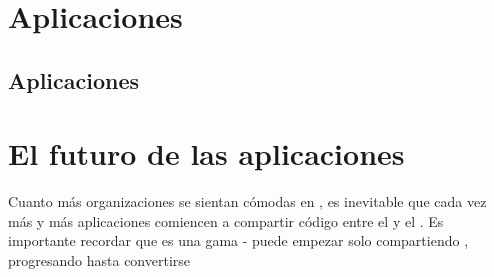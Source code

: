 
\section{Aplicaciones \webINT}\label{cap:estadoArte:section:web_app}

\subsection{\singlePageAppINT}

\subsection{Aplicaciones \isomorphicAS}

\section{El futuro de las aplicaciones \webINT}

Cuanto más organizaciones se sientan cómodas \runningCPT \nodejsNAME en \productionPC, es inevitable que cada vez más y más aplicaciones \webINT comiencen a compartir código entre el \clientAS y el \serverAS. Es importante recordar que \isomorphicAS \javaScriptNAME es una gama - puede empezar solo compartiendo \templatesAS, progresando hasta convertirse

